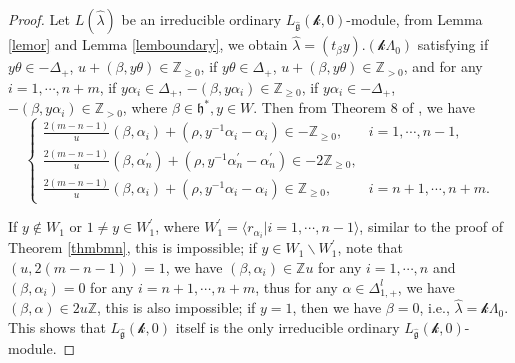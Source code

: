\documentclass[12pt]{article}
\begin{document}
\begin{proof}
Let $L(\hat{\lambda})$ be an irreducible ordinary $L_{\widehat{\mathfrak{g}}}(\mathcal{k},0)$-module,
from Lemma \ref{lemor} and Lemma \ref{lemboundary},
we obtain $\hat{\lambda}=(t_\beta y).(\mathcal{k}\Lambda_0)$
satisfying if $y\theta\in -\Delta_+$, $u+(\beta,y\theta)\in\mathbb{Z}_{\geq0}$,
if $y\theta\in \Delta_+$, $u+(\beta,y\theta)\in\mathbb{Z}_{>0}$,
and for any $i=1,\cdots,n+m$,
if $y\alpha_i\in \Delta_+$, $-(\beta,y\alpha_i)\in\mathbb{Z}_{\geq0}$,
if $y\alpha_i\in -\Delta_+$, $-(\beta,y\alpha_i)\in\mathbb{Z}_{>0}$,
where $\beta\in \mathfrak{h}^*, y\in W$.
Then from Theorem 8 of \cite{Kac77}, we have
$$\begin{cases}
  \frac{2(m-n-1)}{u}(\beta,\alpha_i)+(\rho,y^{-1}\alpha_i-\alpha_i)\in -\mathbb{Z}_{\geq0},&i=1,\cdots,n-1,\\
 \frac{2(m-n-1)}{u}(\beta,\alpha_n^\prime)+(\rho,y^{-1}\alpha_n^\prime-\alpha_n^\prime)\in -2\mathbb{Z}_{\geq0},\\
  \frac{2(m-n-1)}{u}(\beta,\alpha_i)+(\rho,y^{-1}\alpha_i-\alpha_i)\in \mathbb{Z}_{\geq0},&i=n+1,\cdots,n+m.
\end{cases}$$

If $y\notin W_1$ or $1\ne y\in W_1^\prime$,
where $W_1^\prime=\langle r_{\alpha_i}|i=1,\cdots,n-1\rangle$,
similar to the proof of Theorem \ref{thmbmn},
this is impossible;
if $y\in W_1\backslash W_1^\prime$,
note that $(u, 2(m-n-1))=1$, we have $(\beta,\alpha_i)\in \mathbb{Z}u$ for any $i=1,\cdots,n$
and $(\beta,\alpha_i)=0$ for any $i=n+1,\cdots,n+m$,
thus for any \(\alpha \in \Delta_{1,+}^l\), we have $(\beta,\alpha)\in 2u\mathbb{Z}$,
this is also impossible;
if $y=1$, then we have $\beta=0$, i.e., $\hat{\lambda}=\mathcal{k}\Lambda_0$.
This shows that $L_{\widehat{\mathfrak{g}}}(\mathcal{k},0)$ itself is the only irreducible ordinary $L_{\widehat{\mathfrak{g}}}(\mathcal{k},0)$-module.
\end{proof}
\end{document}
